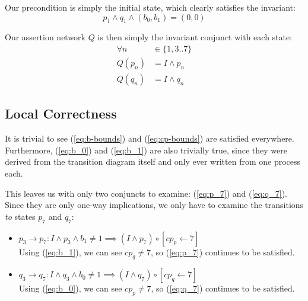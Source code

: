 \documentclass[a4paper]{scrartcl}
\newcommand{\comp}{\circ}
\begin{document}
Our precondition is simply the initial state, which clearly satisfies the invariant:
\[p_1 \land q_1 \land (b_0, b_1) = (0, 0)\]

Our assertion network \(Q\) is then simply the invariant conjunct with each state:
\begin{align*}
    \forall n &\in \{1, 3..7\} \\
    Q(p_n) &= I \land p_n \\
    Q(q_n) &= I \land q_n
\end{align*}

\subsection{Local Correctness}
It is trivial to see (\ref{eq:b-bounds}) and (\ref{eq:cp-bounds}) are satisfied everywhere. Furthermore, (\ref{eq:b_0}) and (\ref{eq:b_1}) are also trivially true, since they were derived from the transition diagram itself and only ever written from one process each.

This leaves us with only two conjuncts to examine: (\ref{eq:p_7}) and (\ref{eq:q_7}). Since they are only one-way implications, we only have to examine the transitions \emph{to} states \(p_7\) and \(q_7\):
\begin{itemize}
    \item \(p_3 \to p_7: I \land p_3 \land b_1 \neq 1 \implies (I \land p_7) \comp [cp_p \leftarrow 7]\) \\
        Using (\ref{eq:b_1}), we can see \(cp_q \neq 7\), so (\ref{eq:p_7}) continues to be satisfied.
    \item \(q_3 \to q_7: I \land q_3 \land b_0 \neq 1 \implies (I \land q_7) \comp [cp_q \leftarrow 7]\) \\
        Using (\ref{eq:b_0}), we can see \(cp_p \neq 7\), so (\ref{eq:q_7}) continues to be satisfied.
\end{itemize}
\end{document}
